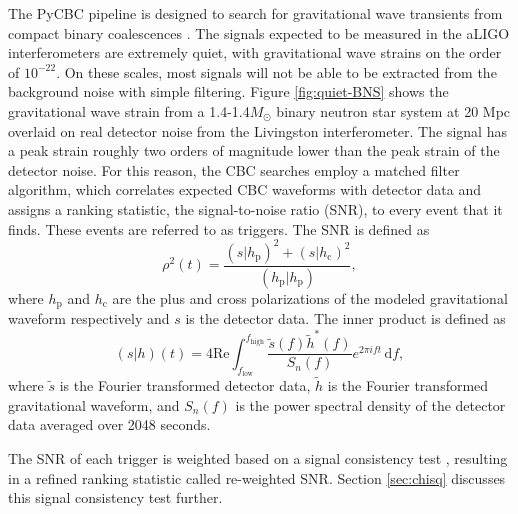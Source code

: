 The PyCBC pipeline is designed to search for gravitational wave transients from compact binary
coalescences \cite{Usman:2015kfa}. 
The signals expected to be measured in the aLIGO interferometers are extremely quiet, 
with gravitational wave strains on the order of $10^{-22}$. On these scales, most 
signals will not be able to be extracted from the background noise with simple filtering. 
Figure \ref{fig:quiet-BNS} shows the gravitational wave strain from a 1.4-1.4$M_{\odot}$ 
binary neutron star system at 20 Mpc overlaid on real detector noise from the Livingston 
interferometer. The signal has a peak strain roughly two orders of magnitude lower than 
the peak strain of the detector noise. 
For this reason, the CBC searches employ a matched filter algorithm, which correlates expected CBC
waveforms with detector data and assigns a ranking statistic, the signal-to-noise ratio (SNR),
to every event that it finds. These events are referred to as triggers.
The SNR is defined as 
\begin{equation}
\rho^2(t) = \frac{(s|h_\mathrm{p})^2 + (s|h_\mathrm{c})^2}{(h_\mathrm{p}|h_\mathrm{p})},
\label{eq:snr}
\end{equation}
where $h_\mathrm{p}$ and $h_\mathrm{c}$ are the plus and cross polarizations of the 
modeled gravitational waveform respectively and $s$ is the detector data. The inner product 
is defined as
\begin{equation}
(s|h)(t) = 4\mathrm{Re}\int_{f_\mathrm{low}}^{f_\mathrm{high}} \frac{\tilde{s}(f)\tilde{h}^*(f)}{S_n (f)}e^{2\pi i f t}\, \mathrm{d}f,
\label{eq:inner-product}
\end{equation}
where $\tilde{s}$ is the Fourier transformed detector data, $\tilde{h}$ is the Fourier 
transformed gravitational waveform, and $S_n (f)$ is the power spectral 
density of the detector data averaged over 2048 seconds.

The SNR of each trigger is weighted based on a signal consistency test \cite{Allen:2004gu},
resulting in a refined ranking statistic called re-weighted SNR.
Section \ref{sec:chisq} discusses this signal consistency test further.


